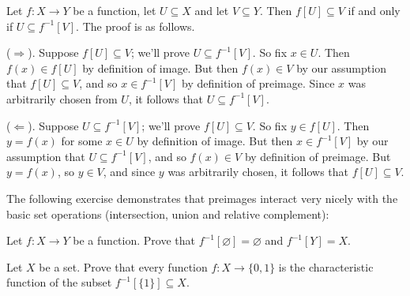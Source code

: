 \begin{example}
Let $f : X \to Y$ be a function, let $U \subseteq X$ and let $V \subseteq Y$. Then $f[U] \subseteq V$ if and only if $U \subseteq f^{-1}[V]$. The proof is as follows.

($\Rightarrow$). Suppose $f[U] \subseteq V$; we'll prove $U \subseteq f^{-1}[V]$. So fix $x \in U$. Then $f(x) \in f[U]$ by definition of image. But then $f(x) \in V$ by our assumption that $f[U] \subseteq V$, and so $x \in f^{-1}[V]$ by definition of preimage. Since $x$ was arbitrarily chosen from $U$, it follows that $U \subseteq f^{-1}[V]$.

($\Leftarrow$). Suppose $U \subseteq f^{-1}[V]$; we'll prove $f[U] \subseteq V$. So fix $y \in f[U]$. Then $y=f(x)$ for some $x \in U$ by definition of image. But then $x \in f^{-1}[V]$ by our assumption that $U \subseteq f^{-1}[V]$, and so $f(x) \in V$ by definition of preimage. But $y=f(x)$, so $y \in V$, and since $y$ was arbitrarily chosen, it follows that $f[U] \subseteq V$.
\end{example}

The following exercise demonstrates that preimages interact very nicely with the basic set operations (intersection, union and relative complement):

\begin{exercise}
Let $f : X \to Y$ be a function. Prove that $f^{-1}[\varnothing] = \varnothing$ and $f^{-1}[Y]=X$.
\end{exercise}

\begin{exercise}
\label{exCharacteristicFunctionsCorrespondWithSubsets}
Let $X$ be a set. Prove that every function $f : X \to \{0,1\}$ is the characteristic function of the subset $f^{-1}[\{1\}] \subseteq X$.
\end{exercise}

